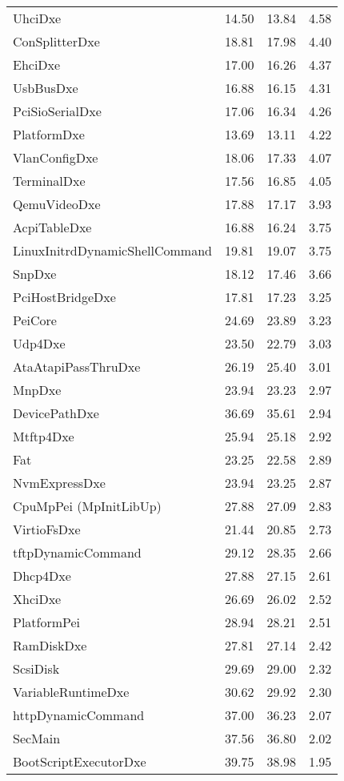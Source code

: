 \begin{longtable}{l c c c}
  UhciDxe & 14.50 & 13.84 & 4.58\\
  ConSplitterDxe & 18.81 & 17.98 & 4.40\\
  EhciDxe & 17.00 & 16.26 & 4.37\\
  UsbBusDxe & 16.88 & 16.15 & 4.31\\
  PciSioSerialDxe & 17.06 & 16.34 & 4.26\\
  PlatformDxe & 13.69 & 13.11 & 4.22\\
  VlanConfigDxe & 18.06 & 17.33 & 4.07\\
  TerminalDxe & 17.56 & 16.85 & 4.05\\
  QemuVideoDxe & 17.88 & 17.17 & 3.93\\
  AcpiTableDxe & 16.88 & 16.24 & 3.75\\
  LinuxInitrdDynamicShellCommand & 19.81 & 19.07 & 3.75\\
  SnpDxe & 18.12 & 17.46 & 3.66\\
  PciHostBridgeDxe & 17.81 & 17.23 & 3.25\\
  PeiCore & 24.69 & 23.89 & 3.23\\
  Udp4Dxe & 23.50 & 22.79 & 3.03\\
  AtaAtapiPassThruDxe & 26.19 & 25.40 & 3.01\\
  MnpDxe & 23.94 & 23.23 & 2.97\\
  DevicePathDxe & 36.69 & 35.61 & 2.94\\
  Mtftp4Dxe & 25.94 & 25.18 & 2.92\\
  Fat & 23.25 & 22.58 & 2.89\\
  NvmExpressDxe & 23.94 & 23.25 & 2.87\\
  CpuMpPei (MpInitLibUp) & 27.88 & 27.09 & 2.83\\
  VirtioFsDxe & 21.44 & 20.85 & 2.73\\
  tftpDynamicCommand & 29.12 & 28.35 & 2.66\\
  Dhcp4Dxe & 27.88 & 27.15 & 2.61\\
  XhciDxe & 26.69 & 26.02 & 2.52\\
  PlatformPei & 28.94 & 28.21 & 2.51\\
  RamDiskDxe & 27.81 & 27.14 & 2.42\\
  ScsiDisk & 29.69 & 29.00 & 2.32\\
  VariableRuntimeDxe & 30.62 & 29.92 & 2.30\\
  httpDynamicCommand & 37.00 & 36.23 & 2.07\\
  SecMain & 37.56 & 36.80 & 2.02\\
  BootScriptExecutorDxe & 39.75 & 38.98 & 1.95\\

\end{longtable}
